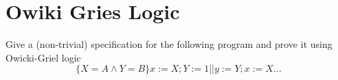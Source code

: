 \section{Owiki Gries Logic}
Give a (non-trivial) specification for the following program and prove it using Owicki-Griel logic
\begin{equation*}
	\{X=A\wedge Y=B\}x:=X;Y:=1 ||y :=Y; x:=X\ldots
\end{equation*}